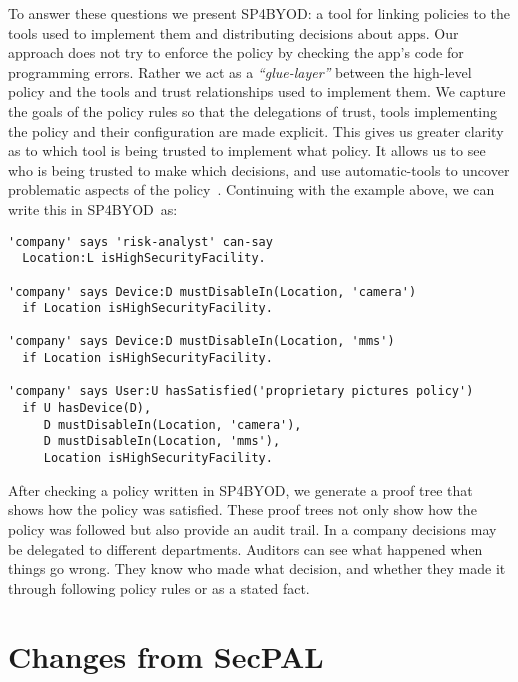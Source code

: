 \documentclass{llncs}
\newcommand{\AppPAL}[0]{SP4BYOD}
\begin{document}
To answer these questions we present \AppPAL{}: 
  a tool for linking policies to the tools used to implement them and distributing decisions about apps.
Our approach does not try to enforce the policy by checking the app's code for programming errors.
Rather we act as a \emph{``glue-layer''} between the high-level policy and the tools and trust relationships used to implement them.
We capture the goals of the policy rules so that the delegations of trust, tools implementing the policy and their configuration are made explicit.
This gives us greater clarity as to which tool is being trusted to implement what policy.
It allows us to see who is being trusted to make which decisions,
  and use automatic-tools to uncover problematic aspects of the policy~\cite{hallett_specifying_2016}.
Continuing with the example above, we can write this in \AppPAL~as:

\begin{lstlisting}
'company' says 'risk-analyst' can-say
  Location:L isHighSecurityFacility.

'company' says Device:D mustDisableIn(Location, 'camera')
  if Location isHighSecurityFacility.

'company' says Device:D mustDisableIn(Location, 'mms')
  if Location isHighSecurityFacility.

'company' says User:U hasSatisfied('proprietary pictures policy')
  if U hasDevice(D),
     D mustDisableIn(Location, 'camera'),
     D mustDisableIn(Location, 'mms'),
     Location isHighSecurityFacility.
\end{lstlisting}

After checking a policy written in \AppPAL, we generate a proof tree that shows how the policy was satisfied.
These proof trees not only show how the policy was followed but also provide an audit trail.
In a company decisions may be delegated to different departments.
Auditors can see what happened when things go wrong.
They know who made what decision, and whether they made it through following policy rules or as a stated fact.


\section{Changes from SecPAL}
\label{ssec:changes}
\end{document}
